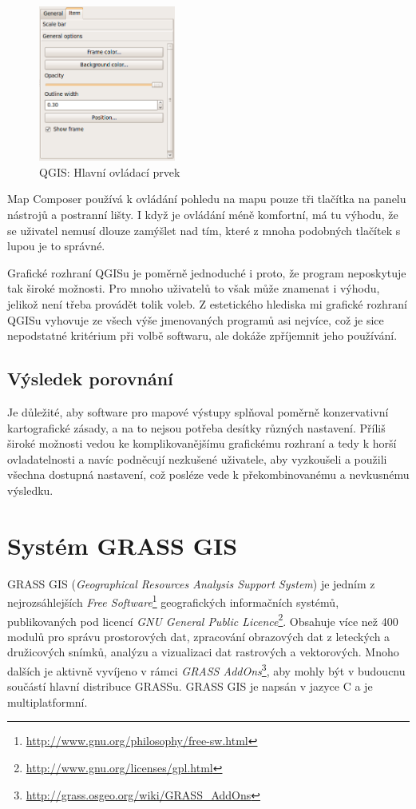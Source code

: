 \documentclass[a4paper,12pt,draft]{article}
\begin{document}
{\begin{figure}[h!]
\centering
\includegraphics[width=0.4\textwidth]{./GUI_screenshots/QGIS_panel.png}
\caption{QGIS: Hlavní ovládací prvek}
\label{fig:QGIS_panel}
\end{figure}

Map Composer používá k ovládání pohledu na mapu pouze tři tlačítka
na panelu nástrojů a postranní lišty. I když je ovládání méně
komfortní, má tu výhodu, že se uživatel nemusí dlouze zamýšlet nad
tím, které z mnoha podobných tlačítek s lupou je to správné.

Grafické rozhraní QGISu je poměrně jednoduché i proto, že program
neposkytuje tak široké možnosti. Pro mnoho uživatelů to však
může znamenat i výhodu, jelikož není třeba provádět tolik voleb.
Z estetického hlediska mi grafické rozhraní QGISu vyhovuje ze všech výše
jmenovaných programů asi nejvíce, což je sice nepodstatné kritérium
při volbě softwaru, ale dokáže zpříjemnit jeho používání.

\subsection{Výsledek porovnání}
Je důležité, aby software pro mapové výstupy splňoval poměrně
konzervativní kartografické zásady, a na to nejsou potřeba
desítky různých nastavení. Příliš široké možnosti vedou ke
komplikovanějšímu grafickému rozhraní a tedy k horší ovladatelnosti
a navíc podněcují nezkušené uživatele, aby vyzkoušeli a použili
všechna dostupná nastavení, což posléze vede k překombinovanému a
nevkusnému výsledku.


\section{Systém GRASS GIS}
\label{sec:grass}
GRASS GIS (\emph{Geographical Resources Analysis Support
System}) je jedním z nejrozsáhlejších \emph{Free
Software}\footnote{\url{http://www.gnu.org/philosophy/free-sw.html}}
geografických informačních systémů,
publikovaných pod licencí \emph{GNU General Public
Licence}\footnote{\url{http://www.gnu.org/licenses/gpl.html}}. Obsahuje více
než 400 modulů pro správu prostorových dat, zpracování obrazových dat
z leteckých a družicových snímků, analýzu a vizualizaci dat rastrových
a vektorových. Mnoho dalších je aktivně vyvíjeno v rámci \emph{GRASS
AddOns}\footnote{\url{http://grass.osgeo.org/wiki/GRASS_AddOns}}, aby mohly být
v budoucnu součástí hlavní distribuce GRASSu. GRASS GIS je napsán v jazyce C a
je multiplatformní.

}
\end{document}
